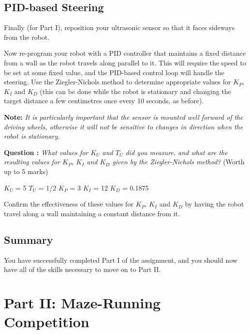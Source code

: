 \documentclass[hidelinks,a4paper,11pt]{article}
\newcounter{question}
\newcommand\myq{\refstepcounter{question}\thequestion}
\begin{document}
	
	\subsection{PID-based Steering}
	
	Finally (for Part I), reposition your ultrasonic sensor so that it faces sideways from the robot.
	
	Now re-program your robot with a PID controller that maintains a fixed distance from a wall as the robot travels along parallel to it.  This will require the speed to be set at some fixed value, and the PID-based control loop will handle the steering.  Use the Ziegler-Nichols method to determine appropriate values for $K_P$, $K_I$ and $K_D$ (this can be done while the robot is stationary and changing the target distance a few centimetres once every 10 seconds, as before).
	
	{\bfseries Note:}  \emph{It is particularly important that the sensor is mounted well forward of the driving wheels, otherwise it will not be sensitive to changes in direction when the robot is stationary.}
	
	{\bfseries Question \myq:}  \emph{What values for $K_U$ and $T_U$ did you measure, and what are the resulting values for $K_P$, $K_I$ and $K_D$  given by the Ziegler-Nichols method?} (Worth up to 5 marks)\\
	\begin{mdframed}
		$K_U$ = 5
		$T_U$ = 1/2
		$K_P$ = 3
		$K_I$  = 12
		$K_D$  = 0.1875
	\end{mdframed}
	\vspace*{\baselineskip}
	
	\begin{todolist}
		\item Confirm the effectiveness of these values for $K_P$, $K_I$ and $K_D$ by having the robot travel along a wall maintaining a constant distance from it.
	\end{todolist}
	
	
	\subsection{Summary}
	
	You have successfully completed Part I of the assignment, and you should now have all of the skills necessary to move on to Part II.
	
	
	\newpage
	\section{Part II: Maze-Running Competition}
	
\end{document}
